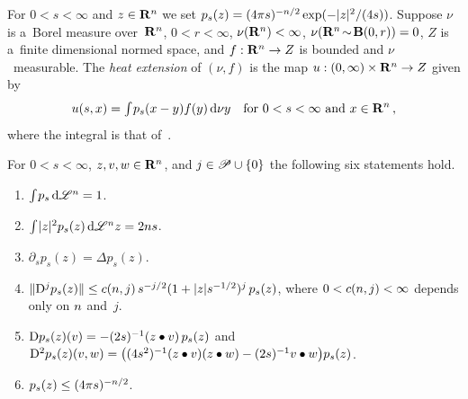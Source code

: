 \documentclass[a4paper,twoside,leqno]{article}
\begin{document}
\begin{definition}
    \label{def:heat}
    For $0 < s < \infty$ and $z \in \mathbf{R}^{n}$ we set $p_s(z) = (4 \pi s)^{-n/2} \exp(-|z|^2
    / (4s))$. Suppose $\nu$ is a~Borel measure over~$\mathbf{R}^{n}$, $0 < r < \infty$, $\nu(\mathbf{R}^{n})
    < \infty$, $\nu(\mathbf{R}^{n} \!\sim\! \mathbf{B}(0,r)) = 0$, $Z$ is a~finite dimensional normed
    space, and $f : \mathbf{R}^{n} \to Z$ is bounded and $\nu$~measurable. The \emph{heat extension}
    of $(\nu,f)$ is the map $u : (0,\infty) \times \mathbf{R}^{n} \to Z$ given by
    \begin{displaymath}
        u(s,x) = {\textstyle\int_{}^{}} p_s(x-y) f(y) \,\mathrm{d} \nu y
        \quad \text{for $0 < s < \infty$ and $x \in \mathbf{R}^{n}$} \,,
    \end{displaymath}
    where the integral is that of~\cite[2.4.12]{Federer1969}.
\end{definition}

\begin{lemma}
    \label{lem:kernel}
    For $0 < s < \infty$, $z, v, w \in \mathbf{R}^{n}$, and $j \in \mathscr{P} \cup \{0\}$ the following six statements
    hold.
    \begin{enumerate}
        \item \label{i:k:mass} ${\textstyle\int_{}^{}} p_s \,\mathrm{d} \mathscr{L}^{n} = 1$.
        \item \label{i:k:moment} ${\textstyle\int_{}^{}} |z|^2 p_s(z) \,\mathrm{d} \mathscr{L}^{n} z = 2 n s$.
        \item \label{i:k:heat} $\partial_s p_s(z) = \Delta p_s(z)$.
        \item \label{i:k:bound} $\|\mathrm{D}^j p_s(z)\| \le c(n,j) \, s^{-j/2} (1 + |z| s^{-1/2})^j \,
        p_s(z)$, where $0 < c(n,j) < \infty$ depends only on $n$ and~$j$.
        \item \label{i:k:formulas} $\mathrm{D} p_s(z)(v) = - (2s)^{-1} (z \bullet v) \, p_s(z)$ and
        $\mathrm{D}^2 p_s(z)(v,w) = \bigl( (4s^2)^{-1} (z \bullet v)(z \bullet w) - (2s)^{-1} v \bullet w
        \bigr) p_s(z)$.
        \item \label{i:k:max} $p_s(z) \le (4 \pi s)^{-n/2}$.
    \end{enumerate}
\end{lemma}
\end{document}

